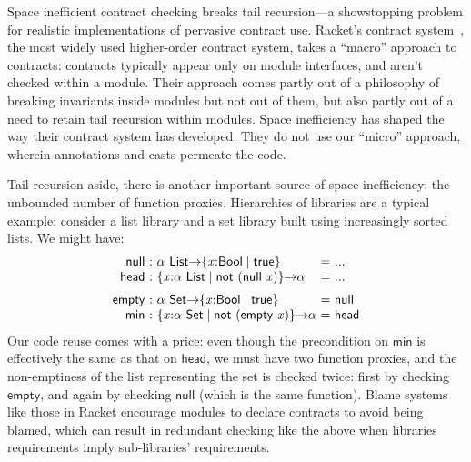\documentclass[9pt]{extarticle}
\begin{document}
Space inefficient contract checking breaks tail recursion---a
showstopping problem for realistic implementations of pervasive
contract use. 
Racket's contract system~\cite{RacketContracts}, the most widely
used higher-order contract system, takes a ``macro'' approach to
contracts: contracts typically appear only on module interfaces, and
aren't checked within a module. Their approach comes partly out of a
philosophy of breaking invariants inside modules but not out of them,
but also partly out of a need to retain tail recursion within
modules. Space inefficiency has shaped the way their contract system
has developed. They do not use our ``micro'' approach, wherein
annotations and casts permeate the code.

Tail recursion aside, there is another important source of space
inefficiency: the unbounded number of function proxies. Hierarchies of
libraries are a typical example: consider a list library and a set
library built using increasingly sorted lists. We might have:
\[ \begin{array}{r@{~:~}l@{~=~}l}
   \mathsf{null}     &    \alpha  ~\mathsf{List}  \mathord{ \rightarrow }  \{ \mathit{x} \mathord{:}  \mathsf{Bool}  \mathrel{\mid}  \mathsf{true}  \}   & ... \\
   \mathsf{head}     &   \{ \mathit{x} \mathord{:}   \alpha  ~\mathsf{List}  \mathrel{\mid}   \mathsf{not}  ~  (   \mathsf{null}  ~ \mathit{x}  )   \}  \mathord{ \rightarrow }  \alpha   & ... \\[6pt]
   \mathsf{empty}  &    \alpha  ~\mathsf{Set}  \mathord{ \rightarrow }  \{ \mathit{x} \mathord{:}  \mathsf{Bool}  \mathrel{\mid}  \mathsf{true}  \}   &  \mathsf{null}  \\
   \mathsf{min}  &   \{ \mathit{x} \mathord{:}   \alpha  ~\mathsf{Set}  \mathrel{\mid}   \mathsf{not}  ~  (   \mathsf{empty}  ~ \mathit{x}  )   \}  \mathord{ \rightarrow }  \alpha   &  \mathsf{head} 
\end{array} \]
Our code reuse comes with a price: even though the precondition on
$ \mathsf{min} $ is effectively the same as that on $ \mathsf{head} $, we must
have two function proxies, and the non-emptiness of the list
representing the set is checked twice: first by checking
$ \mathsf{empty} $, and again by checking $ \mathsf{null} $ (which is the same
function).
Blame systems like those in Racket encourage modules to declare
contracts to avoid being blamed, which can result in redundant
checking like the above when libraries requirements imply
sub-libraries' requirements.
\end{document}
